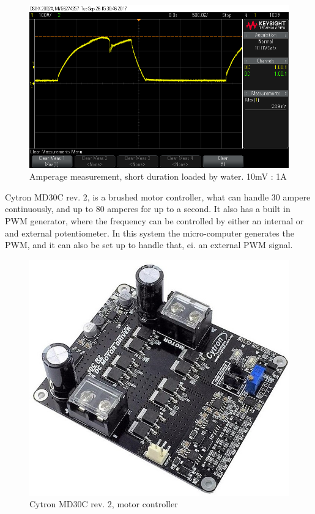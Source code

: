 \begin{figure}[H]
\centering
\includegraphics[width=0.7\linewidth]{Images/Design/motor_amperage_test}
\caption{Amperage measurement, short duration loaded by water. 10mV : 1A}
\label{fig:motoramperagetest}
\end{figure}

Cytron MD30C rev. 2, is a brushed motor controller, what can handle 30 ampere continuously, and up to 80 amperes for up to a second. It also has a built in PWM generator, where the frequency can be controlled by either an internal or and external potentiometer. In this system the micro-computer generates the PWM, and it can also be set up to handle that, ei. an external PWM signal.

\begin{figure}[H]
\centering
\includegraphics[width=0.7\linewidth]{Images/Design/cytron}
\caption{Cytron MD30C rev. 2, motor controller}
\label{fig:cytron}
\end{figure}

